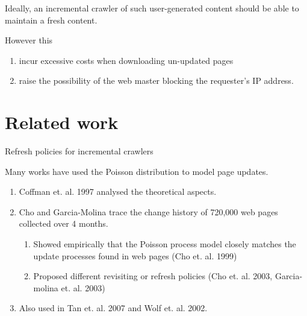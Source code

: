 \documentclass[compress]{beamer}
\begin{document}

\begin{frame}
Ideally, an incremental crawler of such user-generated content should be able to maintain a fresh content. 

However this
	\begin{enumerate}
		\item incur excessive costs when downloading un-updated pages
		\item raise the possibility of the web master blocking the requester's IP address.
	\end{enumerate}
\end{frame}


\section{Related work}

\begin{frame}{Refresh policies for incremental crawlers}

Many works have used the Poisson distribution to model page updates.
	\begin{enumerate}
		\item Coffman et. al. 1997 analysed the theoretical aspects.
		\item Cho and Garcia-Molina trace the change history of 720,000 web pages collected over 4 months.
		\begin{enumerate}		
			\item Showed empirically that the Poisson process model closely matches the update processes found in web pages (Cho et. al. 1999)
			\item Proposed different revisiting or refresh policies (Cho et. al. 2003, Garcia-molina et. al. 2003)
		\end{enumerate}
		\item Also used in Tan et. al. 2007 and Wolf et. al. 2002. %
	\end{enumerate}
\end{frame}
\end{document}
